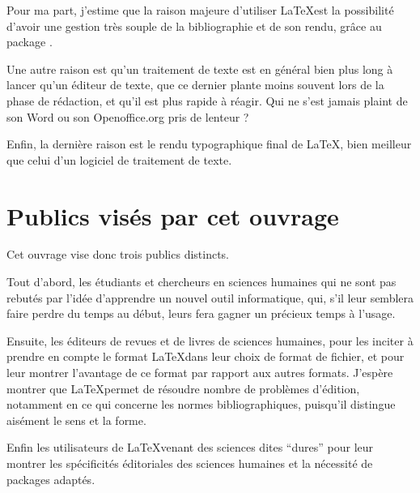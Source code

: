 Pour ma part, j'estime que la raison majeure d'utiliser \LaTeX est la possibilité d'avoir une gestion très souple de la bibliographie et de son rendu, grâce au package . 

Une autre raison est qu'un traitement de texte est en général bien plus long à lancer qu'un éditeur de texte, que ce dernier plante moins souvent lors de la phase de rédaction, et qu'il est plus rapide à réagir. Qui ne s'est jamais plaint de son Word ou son Openoffice.org pris de lenteur ?

Enfin, la dernière raison est le rendu typographique final de \LaTeX, bien meilleur que celui d'un logiciel de traitement de texte.


\section{Publics visés par cet ouvrage}

Cet ouvrage vise donc trois publics distincts.

Tout d'abord, les étudiants et chercheurs en sciences humaines qui ne sont pas rebutés par l'idée d'apprendre un nouvel outil informatique, qui, s'il leur semblera faire perdre du temps au début, leurs fera gagner un précieux temps à l'usage.

Ensuite, les éditeurs de revues et de livres de sciences humaines, pour les inciter à prendre en compte le format \LaTeX dans leur choix de format de fichier, et pour leur montrer l'avantage de ce format par rapport aux autres formats. J'espère montrer que \LaTeX permet de résoudre nombre de problèmes d'édition, notamment en ce qui concerne les normes bibliographiques, puisqu'il distingue aisément le sens et la forme.

Enfin les utilisateurs de \LaTeX venant des sciences dites \enquote{dures} pour leur montrer les spécificités éditoriales des sciences humaines et la nécessité de packages adaptés.

